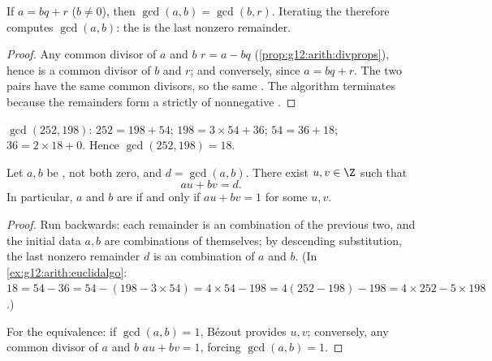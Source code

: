 \begin{proposition}\label{prop:g12:arith:euclidalgo}
If $a = bq + r$ ($b \neq 0$), then $\gcd(a, b) = \gcd(b, r)$. Iterating the
 therefore computes $\gcd(a,b)$: the  is the last
nonzero remainder.
\end{proposition}

\begin{proof}
Any common divisor of $a$ and $b$  $r = a - bq$
(\cref{prop:g12:arith:divprops}), hence is a common divisor of $b$ and $r$;
and conversely, since $a = bq + r$. The two pairs have the same common
divisors, so the same . The algorithm terminates because the remainders
form a strictly   of nonnegative .
\end{proof}

\begin{example}\label{ex:g12:arith:euclidalgo}
$\gcd(252, 198)$: $252 = 198 + 54$; $198 = 3\times54 + 36$;
$54 = 36 + 18$; $36 = 2 \times 18 + 0$. Hence $\gcd(252,198) = 18$.
\end{example}

\begin{theorem}\label{thm:g12:arith:bezout}
Let $a, b$ be , not both zero, and $d = \gcd(a,b)$. There exist
$u, v \in \Z$ such that
\[
au + bv = d .
\]
In particular, $a$ and $b$ are  if and only if $au + bv = 1$ for some
 $u, v$.
\end{theorem}

\begin{proof}
Run  backwards: each remainder is an  combination
of the previous two, and the initial data $a, b$ are combinations of
themselves; by descending substitution, the last nonzero remainder $d$ is an
 combination of $a$ and $b$. (In \cref{ex:g12:arith:euclidalgo}:
$18 = 54 - 36 = 54 - (198 - 3\times54) = 4\times54 - 198 =
4(252 - 198) - 198 = 4\times252 - 5\times198$.)

For the equivalence: if $\gcd(a,b) = 1$, Bézout provides $u, v$; conversely,
any common divisor of $a$ and $b$  $au + bv = 1$, forcing
$\gcd(a,b) = 1$.
\end{proof}

